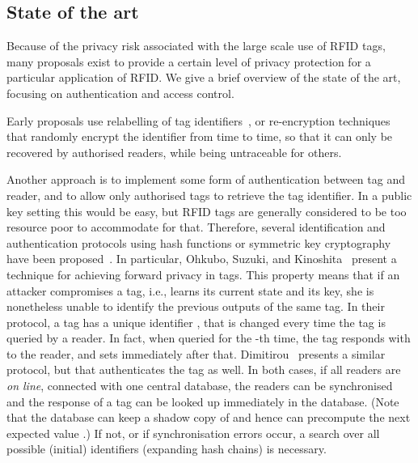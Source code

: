 \subsection{State of the art}
\label{ssec-state}

Because of the privacy risk associated with the large scale use of RFID tags, 
many proposals exist to provide a certain level of privacy
protection for a particular application of RFID. We give a brief overview of
the state of the art, focusing on authentication and access control.

Early proposals use
relabelling of tag identifiers~\cite{sarma2002rfid-report},
or re-encryption 
techniques~\cite{juels2003squealing,avoine2004rfidbanknotes,golle2004reencryption}
that randomly encrypt the identifier from time to time, so that it can only be recovered by authorised readers, while being untraceable for others. 

Another approach is to implement some form of authentication between tag and
reader, and to allow only authorised tags to retrieve the tag identifier.
In a public key setting this would be easy, but RFID tags are generally
considered to be too resource poor to accommodate for that. 
Therefore, several identification and
authentication protocols using hash functions or symmetric key
cryptography have been
proposed~\cite{weis2003security,engberg2004zeroknowledge-rfid}. 
In particular,
Ohkubo, Suzuki, and Kinoshita~\cite{ohkubo2004hash-chains-rfid} present a
technique for achieving forward privacy in tags. This
property means that if an attacker compromises a tag,
i.e., learns its current state and its key, she is nonetheless
unable to identify the previous outputs of the same tag.
In their protocol, a tag has a unique identifier , that is changed
every time the tag is queried by a reader. In fact, when queried for the -th
time, the tag responds with  to the reader, and sets 
 immediately after that. 
Dimitirou~\cite{dimitriou2005lightweight-rfid-protocol} presents a similar
protocol, but that authenticates the tag as well.
In both cases, if all readers are \emph{on line}, connected with one central
database, the readers can be synchronised and the response of a tag can be
looked up immediately in the database. 
(Note that the database can keep a
shadow copy of  and hence can precompute the next expected value
.) 
If not, or if synchronisation errors
occur, a search over all possible (initial) identifiers
(expanding hash chains)
is necessary.

